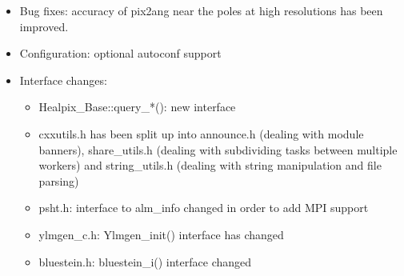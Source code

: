 \documentclass[12pt,twoside]{article}
\begin{document}
{{\begin{itemize}
\item Bug fixes: accuracy of pix2ang near the poles at high resolutions has been improved.

\item Configuration: optional autoconf support

\item Interface changes:
\begin{itemize}
\item Healpix\_Base::query\_*(): new interface
\item cxxutils.h has been split up into
 announce.h (dealing with module banners), 
 share\_utils.h (dealing with subdividing tasks between multiple workers) and
 string\_utils.h (dealing with string manipulation and file parsing)
\item psht.h: interface to alm\_info changed in order to add MPI support
\item ylmgen\_c.h: Ylmgen\_init() interface has changed
\item bluestein.h: bluestein\_i() interface changed
\end{itemize}

\end{itemize}

}}
\end{document}

